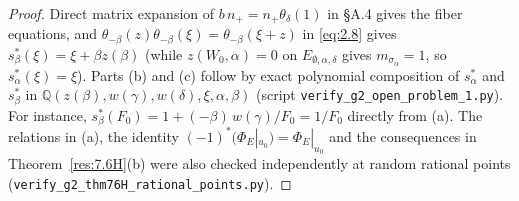 \documentclass[12pt,letterpaper]{amsart}
\theoremstyle{plain}
\theoremstyle{definition}
\theoremstyle{remark}
\theoremstyle{definition}
\newcommand{\qqq}{\mathbb{Q}}
\begin{document}
\begin{proof}
Direct matrix expansion of $b\,n_+=n_+\theta_\delta(1)$ in \S A.4 gives the
fiber equations, and $\theta_{-\beta}(z)\theta_{-\beta}(\xi)=\theta_{-\beta}(\xi+z)$
in \eqref{eq:2.8} gives $s_\beta^*(\xi)=\xi+\beta z(\beta)$ (while
$z(W_0,\alpha)=0$ on $E_{\emptyset,\alpha,\delta}$ gives $m_{\sigma_\alpha}=1$,
so $s_\alpha^*(\xi)=\xi$). Parts (b) and (c) follow by exact polynomial
composition of $s_\alpha^*$ and $s_\beta^*$ in
$\qqq(z(\beta),w(\gamma),w(\delta),\xi,\alpha,\beta)$ (script
\texttt{verify\_g2\_open\_problem\_1.py}). For instance,
$s_\beta^*(F_0)=1+(-\beta)\,w(\gamma)/F_0=1/F_0$ directly from (a). The
relations in (a), the identity $(-1)^*(\Phi_E|_{u_0})=\Phi_E|_{u_0}$ and the
consequences in Theorem~\ref{res:7.6H}(b) were also checked independently at
random rational points (\texttt{verify\_g2\_thm76H\_rational\_points.py}).
\end{proof}
\end{document}
